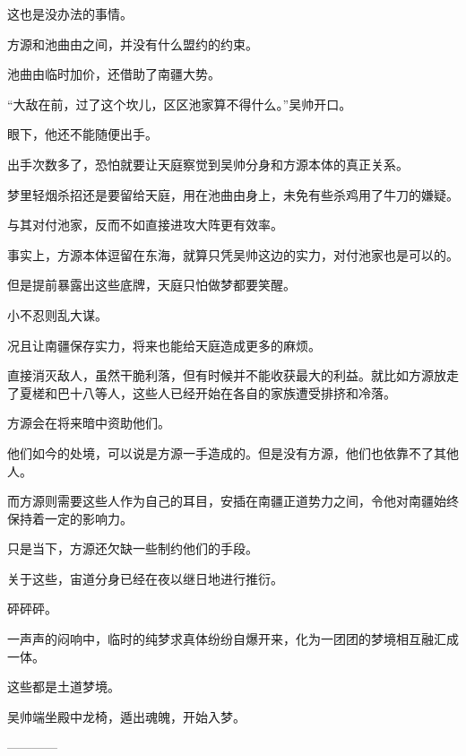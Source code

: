 \begin{this_body}
这也是没办法的事情。

方源和池曲由之间，并没有什么盟约的约束。

池曲由临时加价，还借助了南疆大势。

“大敌在前，过了这个坎儿，区区池家算不得什么。”吴帅开口。

眼下，他还不能随便出手。

出手次数多了，恐怕就要让天庭察觉到吴帅分身和方源本体的真正关系。

梦里轻烟杀招还是要留给天庭，用在池曲由身上，未免有些杀鸡用了牛刀的嫌疑。

与其对付池家，反而不如直接进攻大阵更有效率。

事实上，方源本体逗留在东海，就算只凭吴帅这边的实力，对付池家也是可以的。

但是提前暴露出这些底牌，天庭只怕做梦都要笑醒。

小不忍则乱大谋。

况且让南疆保存实力，将来也能给天庭造成更多的麻烦。

直接消灭敌人，虽然干脆利落，但有时候并不能收获最大的利益。就比如方源放走了夏槎和巴十八等人，这些人已经开始在各自的家族遭受排挤和冷落。

方源会在将来暗中资助他们。

他们如今的处境，可以说是方源一手造成的。但是没有方源，他们也依靠不了其他人。

而方源则需要这些人作为自己的耳目，安插在南疆正道势力之间，令他对南疆始终保持着一定的影响力。

只是当下，方源还欠缺一些制约他们的手段。

关于这些，宙道分身已经在夜以继日地进行推衍。

砰砰砰。

一声声的闷响中，临时的纯梦求真体纷纷自爆开来，化为一团团的梦境相互融汇成一体。

这些都是土道梦境。

吴帅端坐殿中龙椅，遁出魂魄，开始入梦。

------------

\end{this_body}

